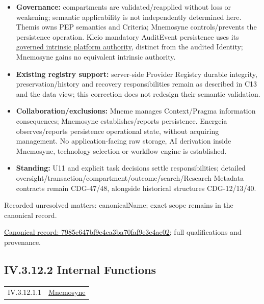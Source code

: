 \begin{itemize}
\item \textbf{Governance:} compartments are validated/reapplied without loss or weakening;
  semantic applicability is not independently determined here. Themis owns PEP
  semantics and Criteria; Mnemosyne controls/prevents the persistence operation.
  Kleio mandatory AuditEvent persistence uses its
  \href{\detokenize{../../../../../docs/markdown/05-information-systems-architecture/component-register.md#kleio-capture-authority}}{governed intrinsic platform authority}, distinct
  from the audited Identity; Mnemosyne gains no equivalent intrinsic authority.

\item \textbf{Existing registry support:} server-side Provider Registry durable integrity,
  preservation/history and recovery responsibilities remain as described in C13
  and the data view; this correction does not redesign their semantic validation.

\item \textbf{Collaboration/exclusions:} Mneme manages Context/Pragma information consequences;
  Mnemosyne establishes/reports persistence. Energeia observes/reports persistence
  operational state, without acquiring management. No application-facing raw storage,
  AI derivation inside Mnemosyne, technology selection or workflow engine is established.

\item \textbf{Standing:} U11 and explicit task decisions settle responsibilities; detailed
  oversight/transaction/compartment/outcome/search/Research Metadata contracts remain
  CDG-47/48, alongside historical structures CDG-12/13/40.

\end{itemize}

{\small Recorded unresolved matters: canonicalName; exact scope remains in the canonical record.}\par
{\footnotesize \href{../../../../continuum/application/application-component/7985e647bf9e4ca3ba70faf9e3e4ae02.md}{Canonical record: 7985e647bf9e4ca3ba70faf9e3e4ae02}; full qualifications and provenance.}\par
\subsection*{IV.3.12.2 Internal Functions}
\label{navigation:IV.3.12.2}

\begin{longtable}{p{.22\linewidth}p{.73\linewidth}}
IV.3.12.1.1 & \hyperref[element:7985e647bf9e4ca3ba70faf9e3e4ae02]{Mnemosyne} \\
\end{longtable}
